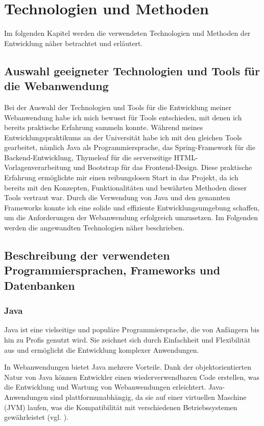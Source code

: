 \documentclass[fontsize=12pt,openright,oneside,paper=a4,BCOR=1cm]{scrbook}
\begin{document}
%
%
\renewcommand{\cleardoublepage}{}
\chapter{Technologien und Methoden}
Im folgenden Kapitel werden die verwendeten Technologien und Methoden der Entwicklung näher betrachtet und erläutert.

\section{Auswahl geeigneter Technologien und Tools für die Webanwendung}
Bei der Auswahl der Technologien und Tools für die Entwicklung meiner Webanwendung habe ich mich bewusst für Tools entschieden, mit denen ich bereits praktische Erfahrung sammeln konnte. Während meines Entwicklungspraktikums an der Universität habe ich mit den gleichen Tools gearbeitet, nämlich Java als Programmiersprache, das Spring-Framework für die Backend-Entwicklung, Thymeleaf für die serverseitige HTML-Vorlagenverarbeitung und Bootstrap für das Frontend-Design. Diese praktische Erfahrung ermöglichte mir einen reibungslosen Start in das Projekt, da ich bereits mit den Konzepten, Funktionalitäten und bewährten Methoden dieser Tools vertraut war. Durch die Verwendung von Java und den genannten Frameworks konnte ich eine solide und effiziente Entwicklungsumgebung schaffen, um die Anforderungen der Webanwendung erfolgreich umzusetzen.
Im Folgenden werden die angewandten Technologien näher beschrieben.

\section{Beschreibung der verwendeten Programmiersprachen, Frameworks und Datenbanken}

\subsection{Java}
Java ist eine vielseitige und populäre Programmiersprache, die von Anfängern bis hin zu Profis genutzt wird. Sie zeichnet sich durch Einfachheit und Flexibilität aus und ermöglicht die Entwicklung komplexer Anwendungen.

In Webanwendungen bietet Java mehrere Vorteile. Dank der objektorientierten Natur von Java können Entwickler einen wiederverwendbaren Code erstellen, was die Entwicklung und Wartung von Webanwendungen erleichtert. Java-Anwendungen sind plattformunabhängig, da sie auf einer virtuellen Maschine (JVM) laufen, was die Kompatibilität mit verschiedenen Betriebssystemen gewährleistet (vgl. \cite{scalosoftjava}).
\end{document}
